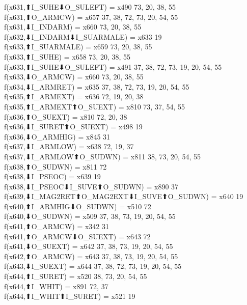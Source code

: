 f(x631,⬆I_SUHE⬇O_SULEFT) = x490 {73, 20, 38, 55} \\
f(x631,⬆O_ARMCW) = x657 {37, 38, 72, 73, 20, 54, 55} \\
f(x631,⬇I_INDARM) = x660 {73, 20, 38, 55} \\
f(x632,⬇I_INDARM⬇I_SUARMALE) = x633 {19} \\
f(x633,⬆I_SUARMALE) = x659 {73, 20, 38, 55} \\
f(x633,⬆I_SUHE) = x658 {73, 20, 38, 55} \\
f(x633,⬆I_SUHE⬇O_SULEFT) = x491 {37, 38, 72, 73, 19, 20, 54, 55} \\
f(x633,⬇O_ARMCW) = x660 {73, 20, 38, 55} \\
f(x634,⬇I_ARMRET) = x635 {37, 38, 72, 73, 19, 20, 54, 55} \\
f(x635,⬆I_ARMEXT) = x636 {72, 19, 20, 38} \\
f(x635,⬆I_ARMEXT⬆O_SUEXT) = x810 {73, 37, 54, 55} \\
f(x636,⬆O_SUEXT) = x810 {72, 20, 38} \\
f(x636,⬇I_SURET⬆O_SUEXT) = x498 {19} \\
f(x636,⬇O_ARMHIG) = x845 {31} \\
f(x637,⬇I_ARMLOW) = x638 {72, 19, 37} \\
f(x637,⬇I_ARMLOW⬆O_SUDWN) = x811 {38, 73, 20, 54, 55} \\
f(x638,⬆O_SUDWN) = x811 {72} \\
f(x638,⬇I_PSEOC) = x639 {19} \\
f(x638,⬇I_PSEOC⬇I_SUVE⬆O_SUDWN) = x890 {37} \\
f(x639,⬇I_MAG2RET⬆O_MAG2EXT⬇I_SUVE⬆O_SUDWN) = x640 {19} \\
f(x640,⬆I_ARMHIG⬇O_SUDWN) = x510 {72} \\
f(x640,⬇O_SUDWN) = x509 {37, 38, 73, 19, 20, 54, 55} \\
f(x641,⬆O_ARMCW) = x342 {31} \\
f(x641,⬆O_ARMCW⬇O_SUEXT) = x643 {72} \\
f(x641,⬇O_SUEXT) = x642 {37, 38, 73, 19, 20, 54, 55} \\
f(x642,⬆O_ARMCW) = x643 {37, 38, 73, 19, 20, 54, 55} \\
f(x643,⬇I_SUEXT) = x644 {37, 38, 72, 73, 19, 20, 54, 55} \\
f(x644,⬆I_SURET) = x520 {38, 73, 20, 54, 55} \\
f(x644,⬆I_WHIT) = x891 {72, 37} \\
f(x644,⬆I_WHIT⬆I_SURET) = x521 {19} \\
